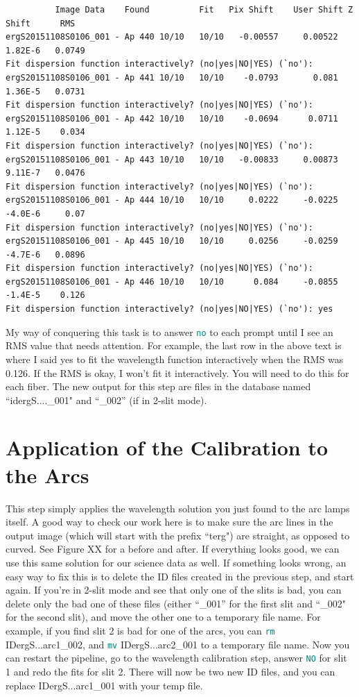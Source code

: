 \documentclass[12pt]{report}
\newcommand{\ty}[1]{\textcolor{teal}{\texttt{#1}}}
\begin{document}
\begin{verbatim}
          Image Data    Found          Fit   Pix Shift    User Shift Z Shift      RMS
ergS20151108S0106_001 - Ap 440 10/10   10/10   -0.00557     0.00522  1.82E-6   0.0749
Fit dispersion function interactively? (no|yes|NO|YES) (`no'): 
ergS20151108S0106_001 - Ap 441 10/10   10/10    -0.0793       0.081  1.36E-5   0.0731
Fit dispersion function interactively? (no|yes|NO|YES) (`no'): 
ergS20151108S0106_001 - Ap 442 10/10   10/10    -0.0694      0.0711  1.12E-5    0.034
Fit dispersion function interactively? (no|yes|NO|YES) (`no'): 
ergS20151108S0106_001 - Ap 443 10/10   10/10   -0.00833     0.00873  9.11E-7   0.0476
Fit dispersion function interactively? (no|yes|NO|YES) (`no'): 
ergS20151108S0106_001 - Ap 444 10/10   10/10     0.0222     -0.0225  -4.0E-6     0.07
Fit dispersion function interactively? (no|yes|NO|YES) (`no'): 
ergS20151108S0106_001 - Ap 445 10/10   10/10     0.0256     -0.0259  -4.7E-6   0.0896
Fit dispersion function interactively? (no|yes|NO|YES) (`no'): 
ergS20151108S0106_001 - Ap 446 10/10   10/10      0.084     -0.0855  -1.4E-5    0.126
Fit dispersion function interactively? (no|yes|NO|YES) (`no'): yes
\end{verbatim}

My way of conquering this task is to answer \ty{no} to each prompt until I see an RMS value that needs attention. For example, the last row in the above text is where I said yes to fit the wavelength function interactively when the RMS was 0.126. If the RMS is okay, I won't fit it interactively. You will need to do this for each fiber. The new output for this step are files in the database named ``idergS....\_001" and ``\_002'' (if in 2-slit mode).

\section{Application of the Calibration to the Arcs}

This step simply applies the wavelength solution you just found to the arc lamps itself. A good way to check our work here is to make sure the arc lines in the output image (which will start with the prefix ``terg") are straight, as opposed to curved. See Figure XX for a before and after. If everything looks good, we can use this same solution for our science data as well. If something looks wrong, an easy way to fix this is to delete the ID files created in the previous step, and start again. If you're in 2-slit mode and see that only one of the slits is bad, you can delete only the bad one of these files (either ``\_001'' for the first slit and ``\_002" for the second slit), and move the other one to a temporary file name. For example, if you find slit 2 is bad for one of the arcs, you can \ty{rm} IDergS...arc1\_002, and \ty{mv} IDergS...arc2\_001 to a temporary file name. Now you can restart the pipeline, go to the wavelength calibration step, answer \ty{NO} for slit 1 and redo the fits for slit 2. There will now be two new ID files, and you can replace IDergS...arc1\_001 with your temp file.
\end{document}
